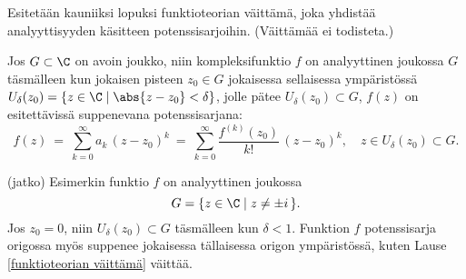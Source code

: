 Esitetään kauniiksi lopuksi funktioteorian väittämä, joka yhdistää analyyttisyyden käsitteen 
potenssisarjoihin. (Väittämää ei todisteta.)
\begin{*Lause} \label{funktioteorian väittämä} Jos $G \subset \C$ on avoin joukko, niin 
kompleksifunktio $f$ on analyyttinen joukossa $G$ täsmälleen kun jokaisen pisteen $z_0 \in G$
jokaisessa sellaisessa ympäristössä $U_{\delta}(z_0) = \{z \in \C \mid \abs{z-z_0} < \delta\}$, 
jolle pätee $U_\delta(z_0) \subset G$, $f(z)$ on esitettävissä suppenevana potenssisarjana:
\[ 
f(z)\ =\ \sum_{k=0}^\infty a_k\,(z-z_0)^k\ 
   =\ \sum_{k=0}^\infty \frac{f^{(k)}(z_0)}{k!}\,(z-z_0)^k, \quad z \in U_\delta(z_0) \subset G.
\]
\end{*Lause}
\jatko \begin{Exa} (jatko) Esimerkin funktio $f$ on analyyttinen joukossa 
\[ 
G = \{z \in \C \mid z \neq \pm i\,\}.
\]
Jos $z_0=0$, niin $U_\delta(z_0) \subset G$ täsmälleen kun $\delta<1$. Funktion $f$ 
potenssisarja origossa myös suppenee jokaisessa tällaisessa origon ympäristössä, kuten Lause
\ref{funktioteorian väittämä} väittää. \loppu 
\end{Exa}

